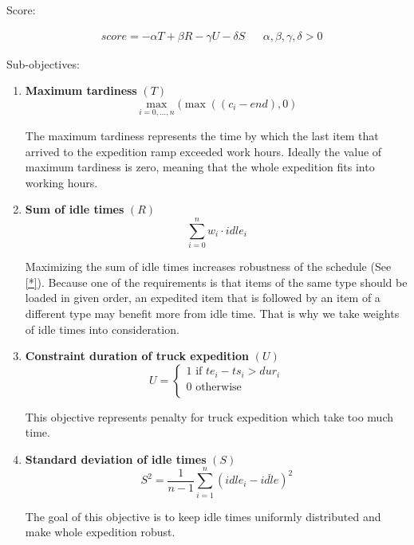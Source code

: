 \documentclass{ctuthesis}
\begin{document}
Score:

\begin{equation}
\begin{aligned}
    &score = -\alpha T + \beta R - \gamma  U - \delta S && \alpha, \beta, \gamma, \delta > 0
\end{aligned}
\end{equation}

Sub-objectives:

\begin{enumerate}
\item \textbf{Maximum tardiness} $(T)$\\ \begin{equation}\max_{i=0,\ldots,n}(\max((c_i - end), 0)\end{equation}

The maximum tardiness represents the time by which the last item that arrived to the expedition ramp exceeded work hours. Ideally the value of maximum tardiness is zero, meaning that the whole expedition fits into working hours.

\item \textbf{Sum of idle times} $(R)$\\ 
\begin{equation}
    \sum_{i=0}^{n} w_i \cdot idle_i
\end{equation}

Maximizing the sum of idle times increases robustness of the schedule (See \ref{*}). Because one of the requirements is that items of the same type should be loaded in given order, an expedited item that is followed by an item of a different type may benefit more from idle time. That is why we take weights of idle times into consideration.

\item \textbf{Constraint duration of truck expedition} $(U)$
\begin{equation} 
   U = \begin{cases}
        1 \text{ if } te_i - ts_i > dur_i\\
        \text{0 otherwise}\\
       \end{cases}
\end{equation}

This objective represents penalty for truck expedition which take too much time.

\item \textbf{Standard deviation of idle times} $(S)$
\begin{equation} 
    S^2=\frac{1}{n-1}\sum_{i=1}^{n} (idle_{i} -\bar{idle})^2 
\end{equation}

The goal of this objective is to keep idle times uniformly distributed and make whole expedition robust.

\end{enumerate}
 
\end{document}
